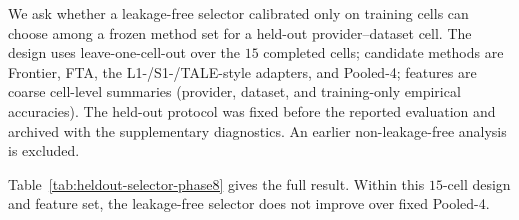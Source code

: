 We ask whether a leakage-free selector calibrated only on training cells can choose among a frozen
method set for a held-out provider--dataset cell. The design uses leave-one-cell-out over the $15$
completed cells; candidate methods are Frontier, FTA, the L1-/S1-/TALE-style adapters, and Pooled-4;
features are coarse cell-level summaries (provider, dataset, and training-only empirical
accuracies). The held-out protocol was fixed before the reported evaluation and archived with the
supplementary diagnostics. An earlier non-leakage-free analysis is excluded.

\begin{table}[tbp]
\centering
\footnotesize
\setlength{\tabcolsep}{4pt}
\caption{Leave-one-cell-out selector over $15$ completed cells with coarse cell-level features.
The selector chooses Pooled-4 in every fold and ties fixed Pooled-4; the oracle row is
non-deployable headroom.}
\label{tab:heldout-selector-phase8}

\end{table}

Table~\ref{tab:heldout-selector-phase8} gives the full result. Within this $15$-cell design and
feature set, the leakage-free selector does not improve over fixed Pooled-4.
